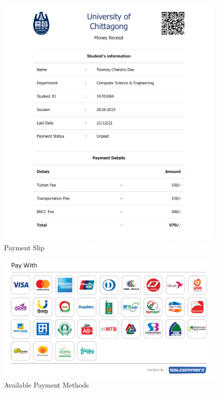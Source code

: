 \begin{figure}[H]
	\includegraphics[width=1\textwidth]{images/payslip}
	\caption{Payment Slip}
\end{figure}
\begin{figure}[H]
	\includegraphics[width=1\textwidth]{images/Payment-Brands}
	\caption{Available Payment Methods}
\end{figure}
